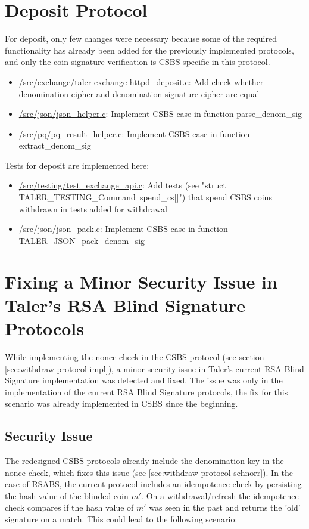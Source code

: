 \section{Deposit Protocol}
For deposit, only few changes were necessary because some of the required functionality has already been added for the previously implemented protocols, and only the coin signature verification is \gls{CSBS}-specific in this protocol.
\begin{itemize}
    \item \url{/src/exchange/taler-exchange-httpd_deposit.c}: Add check whether denomination cipher and denomination signature cipher are equal
    \item \url{/src/json/json_helper.c}: Implement \gls{CSBS} case in function parse\_denom\_sig
    \item \url{/src/pq/pq_result_helper.c}: Implement \gls{CSBS} case in function extract\_denom\_sig
\end{itemize}

Tests for deposit are implemented here:
\begin{itemize}
    \item \url{/src/testing/test_exchange_api.c}: Add tests (see "struct TALER\_TESTING\_Command\ spend\_cs[]") that spend \gls{CSBS} coins withdrawn in tests added for withdrawal
    \item \url{/src/json/json_pack.c}: Implement \gls{CSBS} case in function TALER\_JSON\_pack\_denom\_sig
\end{itemize} 

\section{Fixing a Minor Security Issue in Taler's RSA Blind Signature Protocols}
\label{sec:taler-vuln}
While implementing the nonce check in the \gls{CSBS} protocol (see section \ref{sec:withdraw-protocol-impl}), a minor security issue in Taler's current RSA Blind Signature implementation was detected and fixed.
The issue was only in the implementation of the current RSA Blind Signature protocols, the fix for this scenario was already implemented in \gls{CSBS} since the beginning.

\subsection{Security Issue}
\label{sec:taler-vuln-desc}

The redesigned \gls{CSBS} protocols already include the denomination key in the nonce check, which fixes this issue (see \ref{sec:withdraw-protocol-schnorr}).
In the case of \gls{RSABS}, the current protocol includes an \gls{idempotence} check by persisting the hash value of the blinded coin $m'$. 
On a withdrawal/refresh the \gls{idempotence} check compares if the hash value of $m'$ was seen in the past and returns the 'old' signature on a match.
This could lead to the following scenario:

